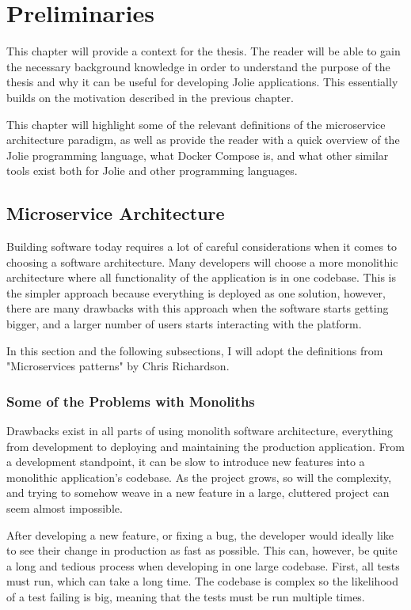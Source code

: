 \chapter{Preliminaries}
This chapter will provide a context for the thesis.
The reader will be able to gain the necessary background knowledge in order
to understand the purpose of the thesis and why it can be useful for developing Jolie applications. This 
essentially builds on the motivation
described in the previous chapter.

This chapter will highlight some of the relevant definitions of the microservice architecture paradigm, as
 well as provide
the reader with a quick overview of the Jolie programming language, what Docker Compose is, and what other similar tools exist 
both for Jolie and other programming languages.

\section{Microservice Architecture}
Building software today requires a lot of careful considerations when it comes
to choosing a software architecture. Many developers will choose a more monolithic architecture where all
 functionality of the application
is in one codebase. This is the simpler approach because everything is deployed as one solution, however,
 there are many drawbacks
with this approach when the software starts getting bigger, and a larger number of users starts 
interacting with the platform.

In this section and the following subsections, I will adopt the definitions from "Microservices patterns"
 by Chris Richardson. \cite{microservicepatterns}

\subsection{Some of the Problems with Monoliths}
Drawbacks exist in all parts of using monolith software architecture, everything from development to 
deploying and maintaining the production application.
From a development standpoint, it can be slow to introduce new features into a monolithic application's
 codebase. As the project grows, so will the complexity, and trying to somehow weave in a new feature in a large, cluttered project can seem almost impossible.

After developing a new feature, or fixing a bug, the developer would ideally like to see their change 
in production as fast as possible. This can, however, be quite a long and tedious process when developing in one large codebase.
First, all tests must run, which can take a long time. The codebase is complex so the likelihood of a 
test failing is big, meaning that the tests must be run multiple times.

